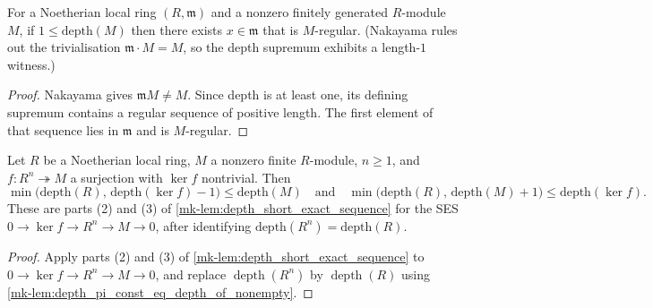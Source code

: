 \begin{lemma}
  \label{mk-lem:exists_isSMulRegular_of_one_le_depth}
  For a Noetherian local ring \((R, \mathfrak m)\) and a nonzero finitely generated
  \(R\)-module \(M\), if \(1 \leq \text{depth}(M)\) then there exists \(x \in \mathfrak m\)
  that is \(M\)-regular. (Nakayama rules out the trivialisation
  \(\mathfrak m \cdot M = M\), so the depth supremum exhibits a length-\(1\) witness.)
\end{lemma}
\begin{proof}

  Nakayama gives \(\mathfrak mM\neq M\). Since depth is at least one,
  its defining supremum contains a regular sequence of positive length.
  The first element of that sequence lies in \(\mathfrak m\) and is
  \(M\)-regular.
\end{proof}

\begin{lemma}\label{mk-lem:depth_ses_ineqs_of_surjection_finite_localRing}
  \leanok

  Let \(R\) be a Noetherian local ring, \(M\) a nonzero finite \(R\)-module, \(n \geq 1\),
  and \(f : R^n \twoheadrightarrow M\) a surjection with \(\ker f\) nontrivial. Then
  \[
    \min\bigl(\text{depth}(R),\, \text{depth}(\ker f) - 1\bigr) \leq \text{depth}(M)
    \quad\text{and}\quad
    \min\bigl(\text{depth}(R),\, \text{depth}(M) + 1\bigr) \leq \text{depth}(\ker f).
  \]
  These are parts (2) and (3) of \ref{mk-lem:depth_short_exact_sequence} for the SES
  \(0 \to \ker f \to R^n \to M \to 0\), after identifying \(\text{depth}(R^n) = \text{depth}(R)\).
\end{lemma}
\begin{proof}
  \leanok

Apply parts (2) and (3) of
  \ref{mk-lem:depth_short_exact_sequence} to
  \(0\to\ker f\to R^n\to M\to0\), and replace
  \(\operatorname{depth}(R^n)\) by \(\operatorname{depth}(R)\) using
  \ref{mk-lem:depth_pi_const_eq_depth_of_nonempty}.
\end{proof}

